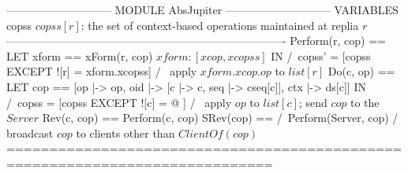 \documentclass[preview, border={5pt 0pt 5pt 1pt}]{standalone}
\begin{document}
\begin{tla}
----------------------------- MODULE AbsJupiter -----------------------------
VARIABLES copss \* $copss[r]$: the set of context-based operations maintained at replia $r$
----------------------------------------------------------------------------
Perform(r, cop) == LET xform == xForm(r, cop) \* $xform: [xcop, xcopss]$
                   IN  /\ copss' = [copss EXCEPT ![r] = xform.xcopss]
                       /\ \* apply $xform.xcop.op$ to $list[r]$
Do(c, op) == LET cop == [op |-> op, oid |-> [c |-> c, seq |-> cseq[c]], ctx |-> ds[c]]
             IN  /\ copss = [copss EXCEPT ![c] = @ ]
                 /\ \* apply $op$ to $list[c]$; send $cop$ to the $Server$
Rev(c, cop) == Perform(c, cop)
SRev(cop) == /\ Perform(Server, cop)
             /\ \* broadcast $cop$ to clients other than $ClientOf(cop)$
=============================================================================
\end{tla}
\begin{tlatex}
\@x{}\moduleLeftDash{}\moduleRightDash\@xx{}%
%
%
\@xx{}%
\@x{}\midbar\@xx{}%
%
\@xx{}%
%
%
\@xx{}%
%
%
\@xx{}%
%
%
%
%
\@xx{}%
\@x{}\bottombar\@xx{}%
\end{tlatex}
\end{document}
